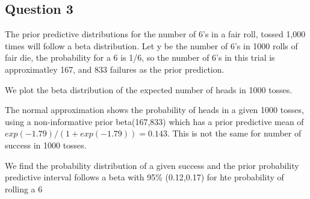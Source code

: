 \documentclass[
]{book}
\theoremstyle{definition}
\theoremstyle{definition}
\theoremstyle{definition}
\theoremstyle{definition}
\theoremstyle{remark}
\begin{document}
\hypertarget{question-3}{%
\subsection*{Question 3}\label{question-3}}

The prior predictive distributions for the number of 6's in a fair roll, tossed 1,000 times will follow a beta distribution. Let y be the number of 6's in 1000 rolls of fair die, the probability for a 6 is 1/6, so the number of 6's in this trial is approximatley 167, and 833 failures as the prior prediction.

We plot the beta distribution of the expected number of heads in 1000 tosses.

The normal approximation shows the probability of heads in a given 1000 tosses, using a non-informative prior beta(167,833) which has a prior predictive mean of \(exp(-1.79)/(1+exp(-1.79)) = 0.143\). This is not the same for number of success in 1000 tosses.

We find the probability distribution of a given success and the prior probability predictive interval follows a beta with 95\% (0.12,0.17) for hte probability of rolling a 6
\end{document}

